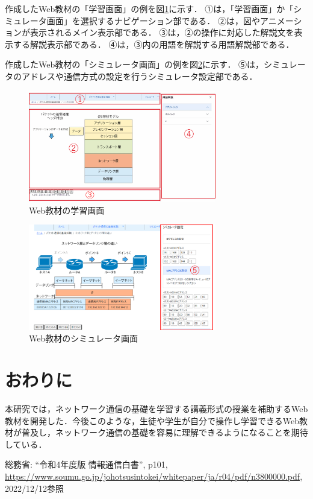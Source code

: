 \documentclass[twocolumn,10pt,a4j]{ltjsarticle}
\begin{document}
作成したWeb教材の「学習画面」の例を図\ref{fig:画面}に示す．
①は，「学習画面」か「シミュレータ画面」を選択するナビゲーション部である．
②は，図やアニメーションが表示されるメイン表示部である．
③は，②の操作に対応した解説文を表示する解説表示部である．
④は，③内の用語を解説する用語解説部である．

作成したWeb教材の「シミュレータ画面」の例を図\ref{fig:画面2}に示す．
⑤は，シミュレータのアドレスや通信方式の設定を行うシミュレータ設定部である．

\begin{figure}[h]
\begin{center}
 \includegraphics[clip,width=82mm]{figures/gamen.pdf}
\end{center}
 \caption{Web教材の学習画面}
 \label{fig:画面}
\end{figure}

\begin{figure}[h]
\begin{center}
 \includegraphics[clip,width=82mm]{figures/gamen2.pdf}
\end{center}
 \caption{Web教材のシミュレータ画面}
 \label{fig:画面2}
\end{figure}

\section{おわりに}
本研究では，ネットワーク通信の基礎を学習する講義形式の授業を補助するWeb教材を開発した．今後このような，生徒や学生が自分で操作し学習できるWeb教材が普及し，ネットワーク通信の基礎を容易に理解できるようになることを期待している．

\begin{thebibliography}{99}
 総務省: ``令和4年度版 情報通信白書'', p101, \url{https://www.soumu.go.jp/johotsusintokei/whitepaper/ja/r04/pdf/n3800000.pdf}, 2022/12/12参照

\end{thebibliography}
\end{document}
